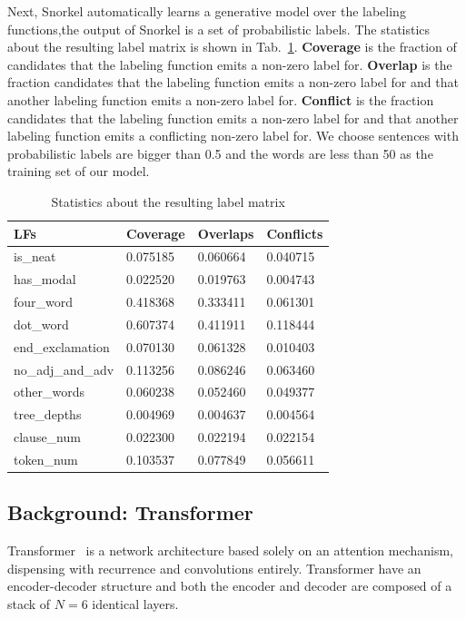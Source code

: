 \documentclass[sigconf]{acmart}
\begin{document}
Next, Snorkel automatically learns a generative model over the labeling functions,the output of Snorkel is a set of probabilistic labels. The statistics about the resulting label matrix is shown in Tab.~\ref{table:LabelMatrix}. \textbf{Coverage} is the fraction of candidates that the labeling function emits a non-zero label for. \textbf{Overlap} is the fraction candidates that the labeling function emits a non-zero label for and that another labeling function emits a non-zero label for. \textbf{Conflict} is the fraction candidates that the labeling function emits a non-zero label for and that another labeling function emits a conflicting non-zero label for. We choose sentences with probabilistic labels are bigger than 0.5 and the words are less than 50 as the training set of our model.

\begin{table}
  \caption{Statistics about the resulting label matrix}
  \label{table:LabelMatrix}
  \begin{tabular}{p{2cm}p{1.5cm}p{1.5cm}p{1.5cm}}
    \toprule
    LFs & Coverage & Overlaps & Conflicts\\
    \midrule
    is\_neat & 0.075185 & 0.060664 & 0.040715\\
    has\_modal & 0.022520 & 0.019763 & 0.004743\\
    four\_word & 0.418368 & 0.333411 & 0.061301 \\
    dot\_word & 0.607374 & 0.411911 & 0.118444\\
    end\_exclamation & 0.070130 & 0.061328 & 0.010403\\
    no\_adj\_and\_adv & 0.113256 & 0.086246 & 0.063460\\
    other\_words & 0.060238 & 0.052460 & 0.049377\\
    tree\_depths & 0.004969 & 0.004637 & 0.004564\\
    clause\_num & 0.022300 & 0.022194 & 0.022154\\
    token\_num & 0.103537 & 0.077849 & 0.056611\\
  \bottomrule
\end{tabular}
\end{table}

\subsection{Background: Transformer}
Transformer~\cite{vaswani2017attention} is a network architecture based solely on an attention mechanism, dispensing with recurrence and convolutions entirely. Transformer have an encoder-decoder structure and both the encoder and decoder are composed of a stack of $N = 6$ identical layers.
\end{document}
